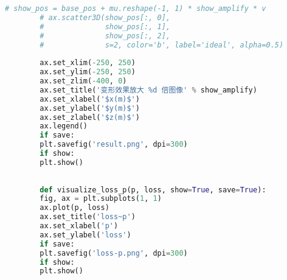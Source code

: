 \documentclass[withoutpreface,bwprint,fontset=macnew]{cumcmthesis} %
\begin{document}
\begin{appendices}
\begin{lstlisting}[language=python]
		# show_pos = base_pos + mu.reshape(-1, 1) * show_amplify * v
		# ax.scatter3D(show_pos[:, 0],
		#              show_pos[:, 1],
		#              show_pos[:, 2],
		#              s=2, color='b', label='ideal', alpha=0.5)
		
		ax.set_xlim(-250, 250)
		ax.set_ylim(-250, 250)
		ax.set_zlim(-400, 0)
		ax.set_title('变形效果放大 %d 倍图像' % show_amplify)
		ax.set_xlabel('$x(m)$')
		ax.set_ylabel('$y(m)$')
		ax.set_zlabel('$z(m)$')
		ax.legend()
		if save:
		plt.savefig('result.png', dpi=300)
		if show:
		plt.show()
		
		
		def visualize_loss_p(p, loss, show=True, save=True):
		fig, ax = plt.subplots(1, 1)
		ax.plot(p, loss)
		ax.set_title('loss~p')
		ax.set_xlabel('p')
		ax.set_ylabel('loss')
		if save:
		plt.savefig('loss-p.png', dpi=300)
		if show:
		plt.show()
		
	\end{lstlisting}

	\end{appendices}
	
\end{document}

